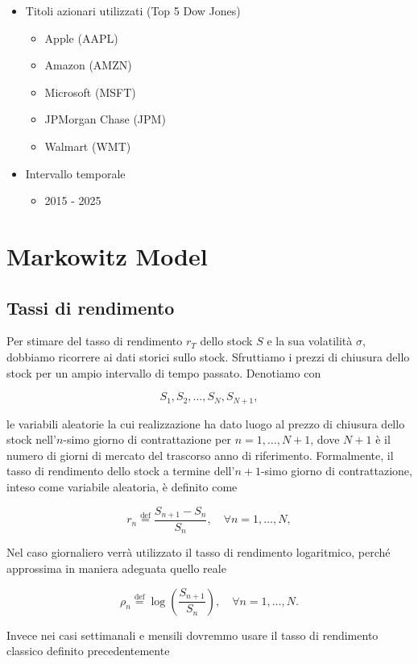 \documentclass[compress]{beamer}
\begin{document}
\begin{frame}{\subsecname}
	\begin{itemize}
		\item Titoli azionari utilizzati (Top 5 Dow Jones)
		\begin{itemize}
			\item Apple (AAPL)
			\item Amazon (AMZN)
			\item Microsoft (MSFT)
			\item JPMorgan Chase (JPM)
			\item Walmart (WMT)
		\end{itemize}
		\item Intervallo temporale
		\begin{itemize}
			\item 2015 - 2025
		\end{itemize}
	\end{itemize}
\end{frame}
\section{Markowitz Model}

\subsection{Tassi di rendimento}
\begin{frame}{\subsecname}
	Per stimare del tasso di rendimento $r_T$ dello stock $S$ e la sua volatilità $\sigma$, dobbiamo ricorrere ai dati storici sullo stock. Sfruttiamo i prezzi di chiusura dello stock per un ampio intervallo di tempo passato. Denotiamo con

	\[
		S_1, S_2, \dots, S_N, S_{N+1},
	\]

	le variabili aleatorie la cui realizzazione ha dato luogo al prezzo di chiusura dello stock nell'$n$-simo giorno di contrattazione per $n = 1, \dots, N+1$, dove $N+1$ è il numero di giorni di mercato del trascorso anno di riferimento. Formalmente, il tasso di rendimento dello stock a termine dell’$n+1$-simo giorno di contrattazione, inteso come variabile aleatoria, è definito come

	\[
		r_n \overset{\text{def}}{=} \frac{S_{n+1} - S_n}{S_n}, \quad \forall n = 1, \dots, N,
	\]
\end{frame}
\begin{frame}{\subsecname}
	Nel caso giornaliero verrà utilizzato il tasso di rendimento logaritmico, perché approssima in maniera adeguata quello reale

	\[
		\rho_n \overset{\text{def}}{=} \log \left( \frac{S_{n+1}}{S_n} \right), \quad \forall n = 1, \dots, N.
	\]

    Invece nei casi settimanali e mensili dovremmo usare il tasso di rendimento classico definito precedentemente
\end{frame}
\end{document}
